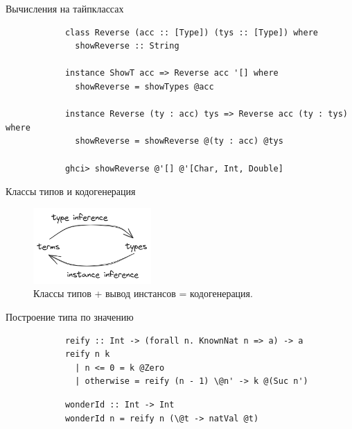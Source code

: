     \begin{frame}[fragile]{Вычисления на тайпклассах}
        \pause
        \begin{verbatim}
            class Reverse (acc :: [Type]) (tys :: [Type]) where
              showReverse :: String

            instance ShowT acc => Reverse acc '[] where
              showReverse = showTypes @acc

            instance Reverse (ty : acc) tys => Reverse acc (ty : tys) where
              showReverse = showReverse @(ty : acc) @tys

            ghci> showReverse @'[] @'[Char, Int, Double]
        \end{verbatim}
    \end{frame}

    \begin{frame}[fragile]{Классы типов и кодогенерация}
        \begin{figure}[h]
            \centering
            \includegraphics[width=0.4\textwidth]{figs/class-sinergy}
            \caption{Классы типов + вывод инстансов = кодогенерация.}
            \label{fig:class-sinergy}
        \end{figure}
    \end{frame}

    \begin{frame}[fragile]{Построение типа по значению}
        \pause
        \begin{verbatim}
            reify :: Int -> (forall n. KnownNat n => a) -> a
            reify n k
              | n <= 0 = k @Zero
              | otherwise = reify (n - 1) \@n' -> k @(Suc n')
        \end{verbatim}
        \pause\vspace{1em}
        \begin{verbatim}
            wonderId :: Int -> Int
            wonderId n = reify n (\@t -> natVal @t)
        \end{verbatim}
    \end{frame}

